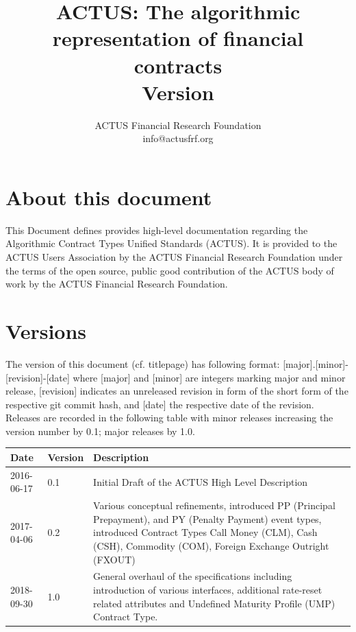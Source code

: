 \documentclass[9pt,oneside]{amsart}
\title{ACTUS: The algorithmic representation of financial contracts \\
      {\smaller \textbf{Version \VersionNumber}}}
\author{
    ACTUS Financial Research Foundation\\
    info@actusfrf.org
}
\begin{document}
%

\maketitle




\section*{About this document}\label{sec:about}

This Document defines provides high-level documentation regarding the Algorithmic Contract Types Unified Standards (ACTUS).  It is provided to the ACTUS Users Association by the ACTUS Financial Research Foundation under the terms of the open source, public good contribution of the ACTUS body of work by the ACTUS Financial Research Foundation.



\section*{Versions}\label{sec:version}

The version of this document (cf. titlepage) has following format: [major].[minor]-[revision]-[date] where [major] and [minor] are integers marking major and minor release, [revision] indicates an unreleased revision in form of the short form of the respective git commit hash, and [date] the respective date of the revision. Releases are recorded in the following table with minor releases increasing the version number by 0.1; major releases by 1.0.

\begin{table}[H]
  \centering
  \begin{tabular}{| p{} | p{} | p{} |}
  \hline
  Date & Version & Description \\ 
  \hline
  2016-06-17 & 0.1 & Initial Draft of the ACTUS High Level Description \\
  \hline
  2017-04-06 & 0.2 & Various conceptual refinements, introduced PP (Principal Prepayment), and PY   (Penalty Payment) event types, introduced Contract Types Call Money (CLM), Cash (CSH), Commodity (COM), Foreign Exchange Outright (FXOUT) \\
  \hline
  2018-09-30 & 1.0 & General overhaul of the specifications including introduction of various interfaces, additional rate-reset related attributes and Undefined Maturity Profile (UMP) Contract Type.\\
  \hline
  \end{tabular}
\end{table}
\end{document}
